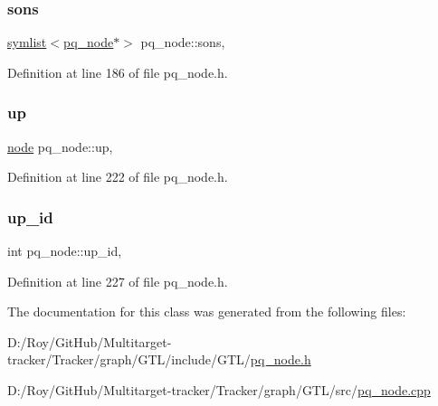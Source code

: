 \mbox{\label{classpq__node_a2cc030cfa4560872acea8b50ebd0542b}} 
\subsubsection{\texorpdfstring{sons}{sons}}
{\footnotesize\ttfamily \mbox{\hyperlink{classsymlist}{symlist}}$<$\mbox{\hyperlink{classpq__node}{pq\+\_\+node}}$\ast$$>$ pq\+\_\+node\+::sons\hspace{0.3cm}{\ttfamily [protected]}, {\ttfamily [inherited]}}



Definition at line 186 of file pq\+\_\+node.\+h.

\mbox{\label{classpq__node_ae6d5a236397b9a57159487eac7ec168d}} 
\subsubsection{\texorpdfstring{up}{up}}
{\footnotesize\ttfamily \mbox{\hyperlink{classnode}{node}} pq\+\_\+node\+::up\hspace{0.3cm}{\ttfamily [protected]}, {\ttfamily [inherited]}}



Definition at line 222 of file pq\+\_\+node.\+h.

\mbox{\label{classpq__node_a5a7bcdde1f57191a77a6a14994b38a50}} 
\subsubsection{\texorpdfstring{up\+\_\+id}{up\_id}}
{\footnotesize\ttfamily int pq\+\_\+node\+::up\+\_\+id\hspace{0.3cm}{\ttfamily [protected]}, {\ttfamily [inherited]}}



Definition at line 227 of file pq\+\_\+node.\+h.



The documentation for this class was generated from the following files\+:\begin{DoxyCompactItemize}
\item 
D\+:/\+Roy/\+Git\+Hub/\+Multitarget-\/tracker/\+Tracker/graph/\+G\+T\+L/include/\+G\+T\+L/\mbox{\hyperlink{pq__node_8h}{pq\+\_\+node.\+h}}\item 
D\+:/\+Roy/\+Git\+Hub/\+Multitarget-\/tracker/\+Tracker/graph/\+G\+T\+L/src/\mbox{\hyperlink{pq__node_8cpp}{pq\+\_\+node.\+cpp}}\end{DoxyCompactItemize}
